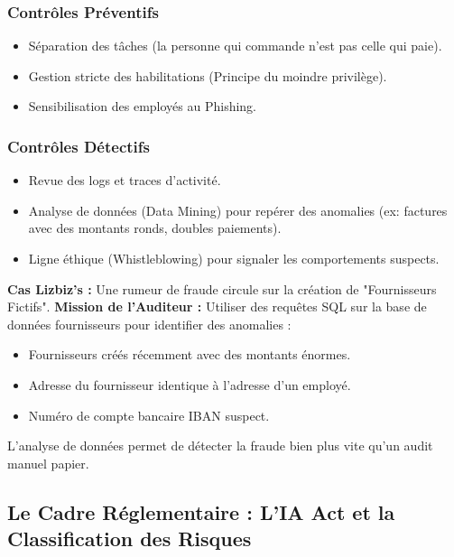 \subsubsection{Contrôles Préventifs}
\begin{itemize}
    \item Séparation des tâches (la personne qui commande n'est pas celle qui paie).
    \item Gestion stricte des habilitations (Principe du moindre privilège).
    \item Sensibilisation des employés au Phishing.
\end{itemize}

\subsubsection{Contrôles Détectifs}
\begin{itemize}
    \item Revue des logs et traces d'activité.
    \item Analyse de données (Data Mining) pour repérer des anomalies (ex: factures avec des montants ronds, doubles paiements).
    \item Ligne éthique (Whistleblowing) pour signaler les comportements suspects.
\end{itemize}

\begin{boxlizbiz}
\textbf{Cas Lizbiz's :}
Une rumeur de fraude circule sur la création de "Fournisseurs Fictifs".
\textbf{Mission de l'Auditeur :} Utiliser des requêtes SQL sur la base de données fournisseurs pour identifier des anomalies :
\begin{itemize}
    \item Fournisseurs créés récemment avec des montants énormes.
    \item Adresse du fournisseur identique à l'adresse d'un employé.
    \item Numéro de compte bancaire IBAN suspect.
\end{itemize}
L'analyse de données permet de détecter la fraude bien plus vite qu'un audit manuel papier.
\end{boxlizbiz}
\subsection{Le Cadre Réglementaire : L'IA Act et la Classification des Risques}

